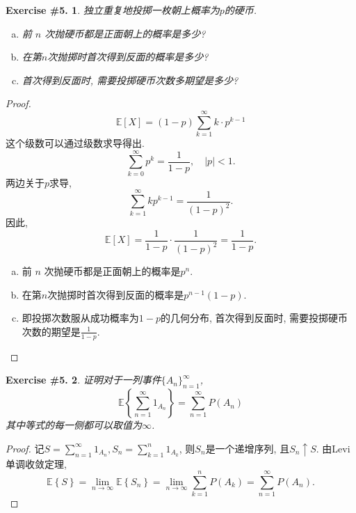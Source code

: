\documentclass[UTF8, a4paper]{article}
\newtheorem{exercise}{Exercise \#5.}
\begin{document}
\begin{framed}
\begin{exercise}
    独立重复地投掷一枚朝上概率为\(p\)的硬币. 
    \begin{enumerate}[a)]
        \item 前 \(n\) 次抛硬币都是正面朝上的概率是多少?
        \item 在第$n$次抛掷时首次得到反面的概率是多少?
        \item 首次得到反面时, 需要投掷硬币次数多期望是多少?
    \end{enumerate}
\end{exercise}
\end{framed}

\begin{proof}
$$
\mathbb{E}[X]=(1-p) \sum_{k=1}^{\infty} k \cdot p^{k-1}
$$
这个级数可以通过级数求导得出. 
$$
\sum_{k=0}^{\infty} p^k=\frac{1}{1-p}, \quad|p|<1 .
$$
两边关于\(p\)求导,
$$
\sum_{k=1}^{\infty} k p^{k-1}=\frac{1}{(1-p)^2} .
$$
因此,
$$
\mathbb{E}[X]=\frac{1}{1-p} \cdot \frac{1}{(1-p)^2}=\frac{1}{1-p} .
$$

\begin{enumerate}[a)]
    \item 前 \(n\) 次抛硬币都是正面朝上的概率是\(p^n\).
    \item 在第\(n\)次抛掷时首次得到反面的概率是\(p^{n-1}(1-p)\).
    \item 即投掷次数服从成功概率为\(1-p\)的几何分布, 首次得到反面时, 需要投掷硬币次数的期望是\(\frac{1}{1-p}\).
\end{enumerate}

\end{proof}



\begin{framed}
\begin{exercise}
证明对于一列事件\(\{A_n\}_{n = 1}^\infty\), 
$$
\mathbb{E}\left\{\sum_{n=1}^{\infty} 1_{A_n}\right\}=\sum_{n=1}^{\infty} P\left(A_n\right)
$$
其中等式的每一侧都可以取值为\(\infty\).
\end{exercise}
\end{framed}

\begin{proof}
记\(S = \sum_{n=1}^{\infty} 1_{A_n}, S_n = \sum_{k=1}^{n} 1_{A_k}\), 则\(S_n\)是一个递增序列, 且\(S_n \uparrow S\). 由Levi单调收敛定理,
$$
\mathbb{E}\left\{S\right\} = \lim_{n\to\infty} \mathbb{E}\left\{S_n\right\} = \lim_{n\to\infty} \sum_{k=1}^{n} P(A_k) = \sum_{n=1}^{\infty} P(A_n).
$$

\end{proof}
\end{document}
